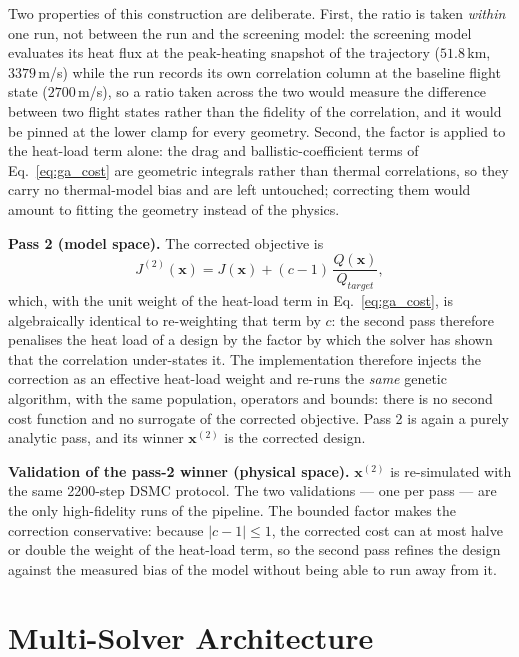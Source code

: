 Two properties of this construction are deliberate. First, the ratio is taken \emph{within} one run, not between the run and the screening model: the screening model evaluates its heat flux at the peak-heating snapshot of the trajectory ($51.8$\,km, $3379$\,m/s) while the run records its own correlation column at the baseline flight state ($2700$\,m/s), so a ratio taken across the two would measure the difference between two flight states rather than the fidelity of the correlation, and it would be pinned at the lower clamp for every geometry. Second, the factor is applied to the heat-load term alone: the drag and ballistic-coefficient terms of Eq.~\eqref{eq:ga_cost} are geometric integrals rather than thermal correlations, so they carry no thermal-model bias and are left untouched; correcting them would amount to fitting the geometry instead of the physics.

\textbf{Pass 2 (model space).} The corrected objective is
\begin{equation}
    J^{(2)}(\mathbf{x}) = J(\mathbf{x}) + (c-1)\,\frac{Q(\mathbf{x})}{Q_{target}},
    \label{eq:corrected_cost}
\end{equation}
which, with the unit weight of the heat-load term in Eq.~\eqref{eq:ga_cost}, is algebraically identical to re-weighting that term by $c$: the second pass therefore penalises the heat load of a design by the factor by which the solver has shown that the correlation under-states it. The implementation therefore injects the correction as an effective heat-load weight and re-runs the \emph{same} genetic algorithm, with the same population, operators and bounds: there is no second cost function and no surrogate of the corrected objective. Pass 2 is again a purely analytic pass, and its winner $\mathbf{x}^{(2)}$ is the corrected design.

\textbf{Validation of the pass-2 winner (physical space).} $\mathbf{x}^{(2)}$ is re-simulated with the same 2200-step DSMC protocol. The two validations --- one per pass --- are the only high-fidelity runs of the pipeline. The bounded factor makes the correction conservative: because $|c-1| \leq 1$, the corrected cost can at most halve or double the weight of the heat-load term, so the second pass refines the design against the measured bias of the model without being able to run away from it.

\section{Multi-Solver Architecture}


